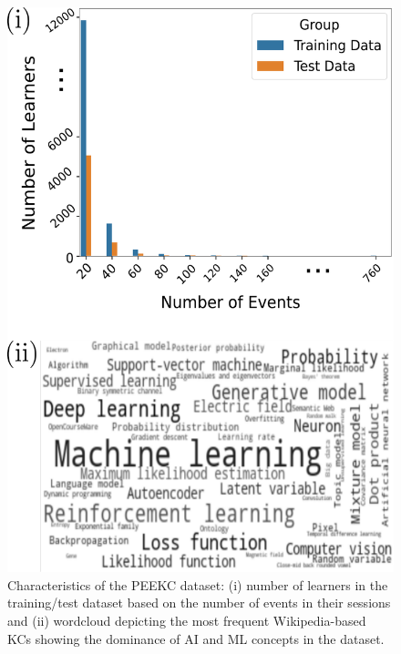 \documentclass[letterpaper]{article} %
\begin{document}

\begin{figure}[ht]
\begin{center}
    \centerline{\includegraphics[width=.7\columnwidth]{dataset.pdf}}
    \caption{Characteristics of the PEEKC dataset: (i) number of learners in the training/test dataset based on the number of events in their sessions and (ii) wordcloud depicting the most frequent Wikipedia-based KCs showing the dominance of AI and ML concepts in the dataset.}
    \label{fig:dataset_stats}
\end{center}
\end{figure}
\end{document}
